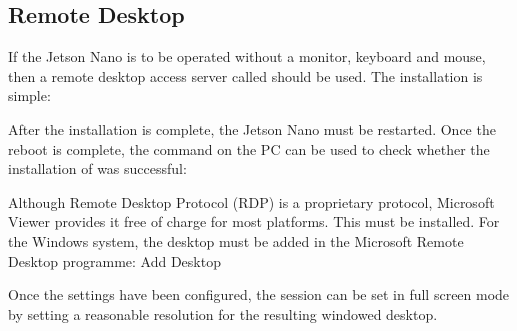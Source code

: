 \subsection{Remote Desktop}


If the Jetson Nano is to be operated without a monitor, keyboard and mouse, then a remote desktop access server called  should be used. The installation is simple:

\medskip


\medskip

After the installation is complete, the Jetson Nano must be restarted. Once the reboot is complete, the  command on the PC can be used to check whether the installation of  was successful:

\medskip











\SHELL{\$}

\medskip




Although Remote Desktop Protocol (RDP) is a proprietary protocol, Microsoft Viewer provides it free of charge for most platforms. This must be installed. For the Windows system, the desktop must be added in the Microsoft Remote Desktop programme: \glqq Add Desktop\grqq

\medskip




Once the settings have been configured, the session can be set in full screen mode by setting a reasonable resolution for the resulting windowed desktop. 

